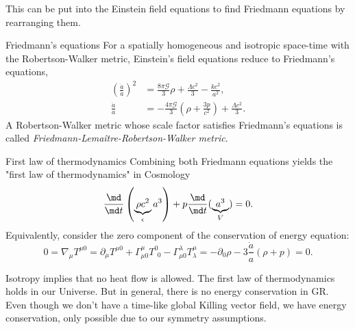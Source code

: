 	This can be put into the Einstein field equations to find Friedmann equations by rearranging them.
	\begin{mybox}{Friedmann's equations}
		For a spatially homogeneous and isotropic space-time with the
		Robertson-Walker metric, Einstein’s field equations reduce
		to Friedmann’s equations,
		\begin{align}
			\left(\frac{\dot{a}}{a}\right)^2 &=\frac{8 \pi \mathcal{G}}{3} \rho + \frac{\Lambda c^2}{3}- \frac{k c^2}{a^2}, \\
			 \frac{\ddot{a}}{a} &= - \frac{4 \pi \mathcal{G}}{3} \left(\rho + \frac{3 p}{c^2}\right) + \frac{\Lambda c^2}{3}.
		\end{align}
		A Robertson-Walker metric whose scale factor satisfies Friedmann’s
		equations is called \emph{Friedmann-Lemaître-Robertson-Walker metric}.
		
	\end{mybox}
	
	\begin{mybox}{First law of thermodynamics}
	 Combining both Friedmann equations yields the "first law of thermodynamics" in Cosmology
	 \begin{equation}
	 	\frac{\md}{\md t} \left(\underbrace{\rho c^2}_{\epsilon} a^3\right) + p \frac{\md}{\md t} (\underbrace{a^3}_{V}) = 0.
	 \end{equation}
	 Equivalently, consider the zero component of the conservation of energy equation:
	 \begin{equation}
	 	0 = \nabla_\mu T^{\mu 0} = \partial_\mu T^{\mu 0} + \Gamma^\mu_{\mu 0} T^0_{\;\,0} - \Gamma^\lambda_{\mu 0} T^\mu_{\lambda}= - \partial_0 \rho - 3 \frac{\dot{a}}{a} (\rho + p) = 0.
	 \end{equation}
	 
	 Isotropy implies that no heat flow is allowed. The first law of thermodynamics holds in our Universe. But in general, there is no energy conservation in GR. Even though we don't have a time-like global Killing vector field, we have energy conservation, only possible due to our symmetry assumptions.
	\end{mybox}
